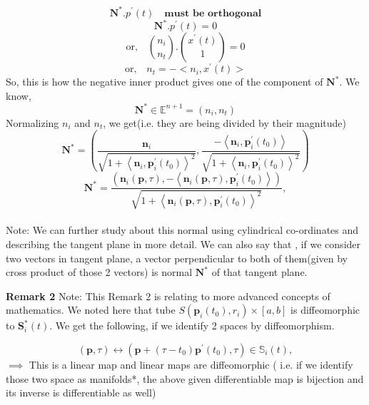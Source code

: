 $$\mathbf{N}^*.p^{'}(t) \quad \textbf{must be orthogonal}$$
$$
\mathbf{N}^*.p^{'}(t)=0
$$
$$
\text{or,} \quad \binom {n_i}{n_t}.\binom {x^{'}(t)}{1}=0
$$
$$
\text{or,} \quad n_t = -\big<   n_i, x^{'}(t)   \big>
$$
So, this is how the negative inner product gives one of the component of $\mathbf{N}^*$. We know,
$$
\mathbf{N}^* \in \mathbb{E}^{n+1} =(n_i,n_t )
$$
Normalizing $ n_i$ and $n_t$, we get(i.e. they are being divided by their magnitude)
$$
\mathbf{N}^*= \left( \frac{ \mathbf{n}_{i} } {\sqrt{1+\left\langle \mathbf{n}_{i}, \mathbf{p}_{i}^{\prime}\left(t_{0}\right)\right\rangle^{2}}},\frac{- \left\langle\mathbf{n}_{i}, \mathbf{p}_{i}^{\prime}\left(t_{0}\right)\right\rangle} {\sqrt{1+\left\langle \mathbf{n}_{i},\mathbf{p}_{i}^{\prime}\left(t_{0}\right)\right\rangle^{2}}} \right)
$$
$$
\mathbf{N}^*= \frac{\left(\mathbf{n}_{i}(\mathbf{p}, \tau),-\left\langle\mathbf{n}_{i}(\mathbf{p}, \tau), \mathbf{p}_{i}^{\prime}\left(t_{0}\right)\right\rangle\right)}{\sqrt{1+\left\langle\mathbf{n}_{i}(\mathbf{p}, \tau), \mathbf{p}_{i}^{\prime}\left(t_{0}\right)\right\rangle^{2}}},
$$\\
Note: We can further study about this normal using cylindrical co-ordinates and describing the tangent plane in more detail. We can also say that , if we consider two vectors in tangent plane, a vector perpendicular to both of them(given by cross product of those 2 vectors)  is normal $\mathbf{N}^*$ of that tangent plane.  























\textbf{Remark 2}
Note: This Remark 2 is relating to more advanced concepts of mathematics.
We noted here that tube $S\left(\mathbf{p}_{i}\left(t_{0}\right), r_{i}\right) \times[a, b]$ is diffeomorphic to $\mathbf{S}_{i}^*(t)$. We get the following, if we identify 2 spaces by diffeomorphism.

$$
(\mathbf{p}, \tau) \leftrightarrow\left(\mathbf{p}+\left(\tau-t_{0}\right) \mathbf{p}^{\prime}\left(t_{0}\right), \tau\right) \in \mathbb{S}_{i}(t),
$$
$\implies$ This is a linear map and linear maps are diffeomorphic ( i.e. if we identify those two space as manifolds*, the above given differentiable map is bijection and its inverse is differentiable as well) 



